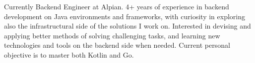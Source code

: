 

\begin{cvparagraph}
	
	Currently Backend Engineer at Alpian. 4+ years of experience in backend development on Java environments and frameworks, with curiosity in exploring also the infrastructural side of the solutions I work on. Interested in devising and applying better methods of solving challenging tasks, and learning new technologies and tools on the backend side when needed. Current personal objective is to master both Kotlin and Go.
\end{cvparagraph}